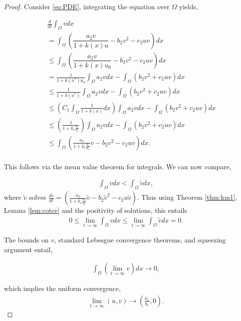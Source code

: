 \documentclass[10pt]{amsart}
\theoremstyle{definition}
\begin{document}
\begin{proof}
Consider \eqref{eq:PDE}, integrating the equation over $\Omega$ yields,

\begin{eqnarray}
&& \frac{d}{dt} \int_{\Omega} v dx \nonumber \\
&& = \int_{\Omega} \left(\dfrac{a_2 v}{1+k(x) u}  - b_2 v^2 - c_2 uv \right) dx\nonumber \\
&& \leq    \int_{\Omega} \left(\dfrac{a_2 v}{1 + k(x)u_{0}}  - b_2 v^2 - c_2 uv \right) dx \nonumber \\
&& =   \frac{1}{1+k(x^{*})u_{0}}\int_{\Omega} a_{2} v dx  - \int_{\Omega}  \left( b_2 v^2 + c_2 uv \right) dx \nonumber \\
&& \leq   \frac{1}{1+k(x^{*})}\int_{\Omega} a_{2} v dx  - \int_{\Omega}  \left( b_2 v^2 + c_2 uv \right) dx \nonumber \\
&&\leq   \left(C_{1}\int_{\Omega} \frac{1}{1+k(x)} dx \right) \int_{\Omega} a_{2} v dx  - \int_{\Omega}  \left( b_2 v^2 + c_2 uv \right) dx \nonumber \\
&& \leq   \left( \frac{1}{1 + k_{c}\frac{a_{1}}{b_{1}}} \right)\int_{\Omega} a_{2}v dx  - \int_{\Omega}  \left( b_2 v^2 + c_2 uv \right) dx \nonumber \\
&&\leq  \int_{\Omega} \left(\frac{a_{2}}{1+k_{c}\frac{a_{1}}{b_{1}}}v  - b_2 v^2 - c_2 uv \right) dx. \nonumber \\
\end{eqnarray}

This follows via the mean value theorem for integrals. We can now compare,

\begin{align}\label{eq:com133}
	\int_{\Omega} v dx  < \int_{\Omega} \tilde{v} dx,
\end{align}
where $\tilde{v}$ solves $\frac{d \tilde{v}}{dt} = \left(\frac{a_{2}}{1+k_{c}\frac{a_{1}}{b_{1}}}\tilde{v}  - b_2 \tilde{v}^2 - c_2 u\tilde{v} \right).$
 Thus using Theorem \ref{thm:km1}, Lemma \ref{lem:cotce}
and the positivity of solutions, this entails
\begin{align}\label{eq:com134}
0 \leq \lim_{t \rightarrow \infty}   \int_{\Omega} v dx     \leq \lim_{t \rightarrow \infty} 	\int_{\Omega} \tilde{v} dx = 0.
\end{align}

The bounds on $v$, standard Lebesgue convergence theorems, and squeezing argument entail,

\begin{align}\label{eq:com133}
	\int_{\Omega} (\lim_{t \rightarrow \infty}  v ) dx  \rightarrow 0 ,
\end{align}

which implies the uniform convergence,
\begin{align*}
\lim_{t \rightarrow \infty} (u,v) \rightarrow \left(\frac{a_{1}}{b_{1}}, 0\right).
\end{align*}

\end{proof}
\end{document}
